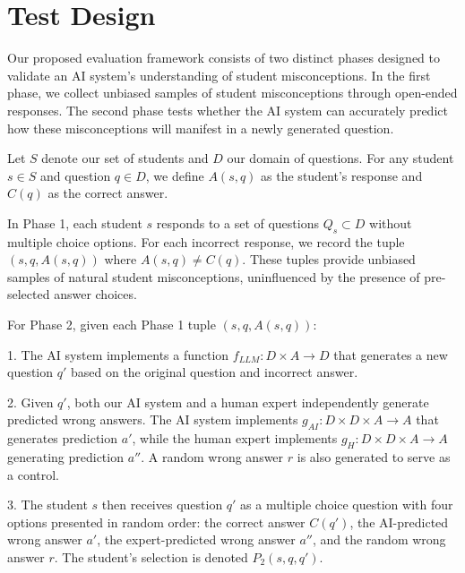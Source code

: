\section{Test Design}

Our proposed evaluation framework consists of two distinct phases designed to validate an AI system's understanding of student misconceptions. In the first phase, we collect unbiased samples of student misconceptions through open-ended responses. The second phase tests whether the AI system can accurately predict how these misconceptions will manifest in a newly generated question.

Let $S$ denote our set of students and $D$ our domain of questions. For any student $s \in S$ and question $q \in D$, we define $A(s,q)$ as the student's response and $C(q)$ as the correct answer. 

In Phase 1, each student $s$ responds to a set of questions $Q_s \subset D$ without multiple choice options. For each incorrect response, we record the tuple $(s,q,A(s,q))$ where $A(s,q) \neq C(q)$. These tuples provide unbiased samples of natural student misconceptions, uninfluenced by the presence of pre-selected answer choices.

For Phase 2, given each Phase 1 tuple $(s,q,A(s,q))$:

1. The AI system implements a function $f_{LLM}: D \times A \to D$ that generates a new question $q'$ based on the original question and incorrect answer.

2. Given $q'$, both our AI system and a human expert independently generate predicted wrong answers. The AI system implements $g_{AI}: D \times D \times A \to A$ that generates prediction $a'$, while the human expert implements $g_H: D \times D \times A \to A$ generating prediction $a''$. A random wrong answer $r$ is also generated to serve as a control.

3. The student $s$ then receives question $q'$ as a multiple choice question with four options presented in random order: the correct answer $C(q')$, the AI-predicted wrong answer $a'$, the expert-predicted wrong answer $a''$, and the random wrong answer $r$. The student's selection is denoted $P_2(s,q,q')$.

